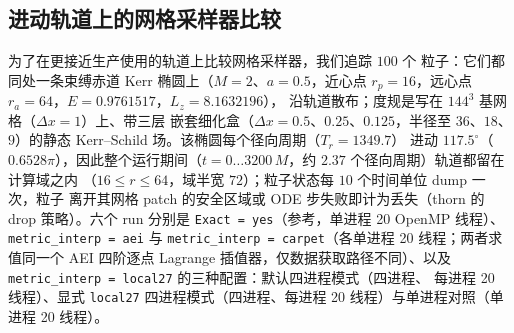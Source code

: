 \documentclass[11pt,UTF8]{ctexart}
\begin{document}
\subsection{进动轨道上的网格采样器比较}\label{sec:sampler-compare}

为了在更接近生产使用的轨道上比较网格采样器，我们追踪 $100$ 个
粒子：它们都同处一条束缚赤道 Kerr 椭圆上（$M=2$、$a=0.5$，近心点
$r_p = 16$，远心点 $r_a = 64$，$E = 0.9761517$，$L_z = 8.1632196$），
沿轨道散布；度规是写在 $144^3$ 基网格（$\Delta x = 1$）上、带三层
嵌套细化盒（$\Delta x = 0.5$、$0.25$、$0.125$，半径至 $36$、$18$、
$9$）的静态 Kerr--Schild 场。该椭圆每个径向周期（$T_r = 1349.7$）
进动 $117.5^\circ$（$0.6528\pi$），因此整个运行期间（$t = 0 \ldots
3200\,M$，约 $2.37$ 个径向周期）轨道都留在计算域之内
（$16 \le r \le 64$，域半宽 $72$）；粒子状态每 $10$ 个时间单位
dump 一次，粒子
离开其网格 patch 的安全区域或 ODE 步失败即计为丢失（thorn 的
drop 策略）。六个 run 分别是 \texttt{Exact = yes}（参考，单进程
20 OpenMP 线程）、\texttt{metric\_interp = aei} 与
\texttt{metric\_interp = carpet}（各单进程 20 线程；两者求值同一个
AEI 四阶逐点 Lagrange 插值器，仅数据获取路径不同）、以及
\texttt{metric\_interp = local27} 的三种配置：默认四进程模式（四进程、
每进程 20 线程）、显式 \texttt{local27} 四进程模式（四进程、每进程
20 线程）与单进程对照（单进程 20 线程）。

\begin{table}[h]
\centering
\caption{Sec.~\ref{sec:sampler-compare} 进动椭圆上网格采样器的比较
（$100$ 粒子，$t = 0 \ldots 3200\,M$；各 run 均无粒子丢失）。
$\max|\Delta x|$：整个运行中逐粒子相对 \texttt{exact} 参考的最大坐标
偏差。$\Delta E$、$\Delta L_z$：守恒量相对初值的绝对偏差最大值与均值。
"p0"：粒子 0 在运行结束时的径向位置。}\label{tab:samplers}
\end{table}
\end{document}
